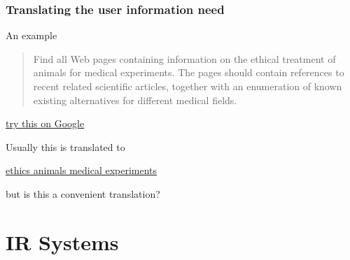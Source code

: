 \documentclass[svgnames]{beamer}
\begin{document}
\begin{frame} \frametitle{Translating the user information need}
  
  \begin{block}{An example}
    \begin{quote}
      Find all Web pages containing information on the ethical treatment of
      animals for medical experiments. The pages should contain references to
      recent related scientific articles, together with an enumeration of known
      existing alternatives for different medical fields.
    \end{quote}
    \begin{flushright}
      \small
      \href{http://www.google.pt/search?q=Find+all+Web+pages+containing+information+on+the+ethical+treatment+of\%0D\%0A++++++animals+for+medical+experiments.+The+pages+should+contain+references+to\%0D\%0A++++++recent+related+scientific+articles\%2C+together+with+an+enumeration+of+known\%0D\%0A++++++existing+alternatives+for+different+medical+fields.}{\alert{try this on Google}}
    \end{flushright}
  \end{block}

  \pause

  \begin{block}{}
    Usually this is translated to
    \begin{center}
      \href{http://www.google.pt/search?q=ethics+animals+medical+experiments}{ethics animals medical experiments}
    \end{center}
    \vspace{-1\baselineskip}
    \begin{flushright}
      but is this a convenient translation?
    \end{flushright}
  \end{block}


\end{frame}



\section{IR Systems}
\end{document}
